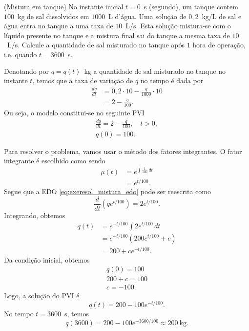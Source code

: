 \begin{exeresol}(Mistura em tanque)\label{exeresol:mistura_em_tanque}
  No instante inicial $t=0$~s (segundo), um tanque contem $100$~kg de sal dissolvidos em $1000$~L d'água. Uma solução de $0,2$~kg/L de sal e água entra no tanque a uma taxa de $10$~L/s. Esta solução mistura-se com o líquido presente no tanque e a mistura final sai do tanque a mesma taxa de $10$~L/s. Calcule a quantidade de sal misturado no tanque após $1$ hora de operação, i.e. quando $t=3600$~s.
\end{exeresol}
\begin{resol}
  Denotando por $q = q(t)$~kg a quantidade de sal misturado no tanque no instante $t$, temos que a taxa de variação de $q$ no tempo é dada por
  \begin{align}
    \frac{dq}{dt} &= 0,2\cdot 10 - \frac{q}{1000}\cdot 10 \\
    &= 2 - \frac{q}{100}.
  \end{align}
  Ou seja, o modelo constitui-se no seguinte PVI
  \begin{align}
    \frac{dq}{dt} = 2 - \frac{q}{100},\quad t>0,\label{eq:exeresol_mistura_edo}\\
    q(0) = 100.
  \end{align}

  Para resolver o problema, vamos usar o método dos fatores integrantes. O fator integrante é escolhido como sendo
  \begin{align}
    \mu(t) &= e^{\int \frac{1}{100}\,dt} \\
    &= e^{t/100}.
  \end{align}
  Segue que a EDO \eqref{eq:exeresol_mistura_edo} pode ser reescrita como
  \begin{equation}
    \frac{d}{dt}\left(qe^{t/100}\right) = 2e^{t/100}.
  \end{equation}
  Integrando, obtemos
  \begin{align}
    q(t) &= e^{-t/100}\int 2e^{t/100}\,dt \\
    &= e^{-t/100}\left(200e^{t/100} + c\right) \\
    &= 200 + ce^{-t/100}.
  \end{align}
  Da condição inicial, obtemos
  \begin{gather}
    q(0) = 100 \\
    200 + c = 100 \\
    c = -100.
  \end{gather}
  Logo, a solução do PVI é
  \begin{equation}
    q(t) = 200 - 100e^{-t/100}.
  \end{equation}
  No tempo $t=3600$~s, temos
  \begin{equation}
    q(3600) = 200 - 100e^{-3600/100} \approx 200~\text{kg}.
  \end{equation}
\end{resol}

